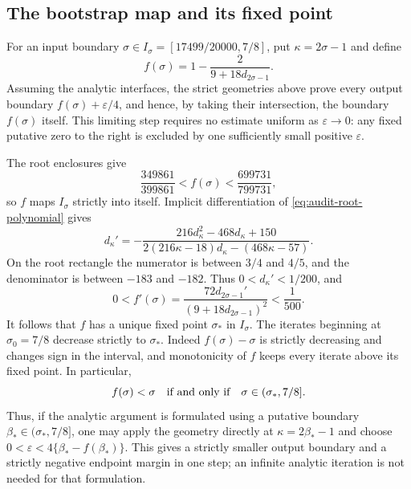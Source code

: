 \documentclass[11pt,a4paper]{article}
\numberwithin{equation}{section}
\theoremstyle{remark}
\begin{document}
\subsection{The bootstrap map and its fixed point}

For an input boundary
\(\sigma\in I_\sigma=[17499/20000,7/8]\), put
\(\kappa=2\sigma-1\) and define
\begin{equation}\label{eq:audit-bootstrap-map}
 f(\sigma)=1-\frac2{9+18d_{2\sigma-1}}.
\end{equation}
Assuming the analytic interfaces, the strict geometries above prove every
output boundary \(f(\sigma)+\varepsilon/4\), and hence, by taking their
intersection, the boundary \(f(\sigma)\) itself.
This limiting step requires no estimate uniform as \(\varepsilon\to0\):
any fixed putative zero to the right is excluded by one sufficiently
small positive \(\varepsilon\).

The root enclosures give
\[
 \frac{349861}{399861}<f(\sigma)<\frac{699731}{799731},
\]
so \(f\) maps \(I_\sigma\) strictly into itself.  Implicit
differentiation of \eqref{eq:audit-root-polynomial} gives
\[
 d_\kappa'=
 -\frac{216d_\kappa^2-468d_\kappa+150}
 {2(216\kappa-18)d_\kappa-(468\kappa-57)}.
\]
On the root rectangle the numerator is between \(3/4\) and \(4/5\),
and the denominator is between \(-183\) and \(-182\).
Thus \(0<d_\kappa'<1/200\), and
\[
 0<f'(\sigma)=\frac{72d_{2\sigma-1}'}{(9+18d_{2\sigma-1})^2}
 <\frac1{500}.
\]
It follows that \(f\) has a unique fixed point \(\sigma_*\) in
\(I_\sigma\).  The iterates beginning at \(\sigma_0=7/8\) decrease
strictly to \(\sigma_*\).  Indeed \(f(\sigma)-\sigma\) is strictly
decreasing and changes sign in the interval, and monotonicity of \(f\)
keeps every iterate above its fixed point.
In particular,
\[
 f(\sigma)<\sigma\quad\hbox{if and only if}\quad
 \sigma\in(\sigma_*,7/8].
\]
Thus, if the analytic argument is formulated using a putative boundary
\(\beta_*\in(\sigma_*,7/8]\), one may apply the geometry directly at
\(\kappa=2\beta_*-1\) and choose
\(0<\varepsilon<4\{\beta_*-f(\beta_*)\}\).
This gives a strictly smaller output boundary and a strictly negative
endpoint margin in one step; an infinite analytic iteration is not
needed for that formulation.
\end{document}
